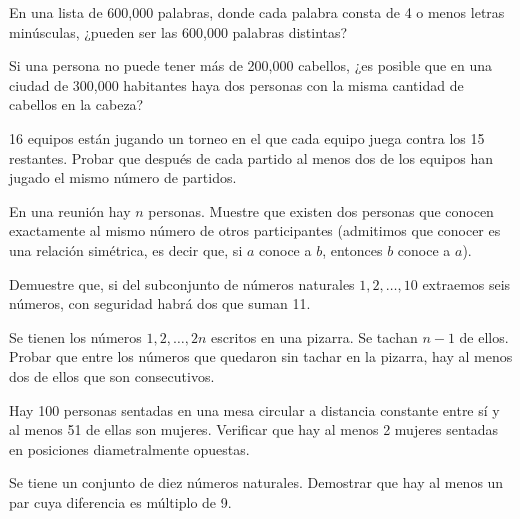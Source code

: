 \begin{problema}
    En una lista de 600,000 palabras, donde cada palabra consta de 4 o menos letras minúsculas, ¿pueden ser las 600,000 palabras distintas?
\end{problema}

\begin{problema}
    Si una persona no puede tener más de 200,000 cabellos, ¿es posible que en una ciudad de 300,000 habitantes haya dos personas con la misma cantidad de cabellos en la cabeza?
\end{problema}

\begin{problema}
    16 equipos están jugando un torneo en el que cada equipo juega contra los 15 restantes. Probar que después de cada partido al menos dos de los equipos han jugado el mismo número de partidos.
\end{problema}

\begin{problema}
    En una reunión hay $n$ personas. Muestre que existen dos personas que conocen exactamente al mismo número de otros participantes (admitimos que conocer es una relación simétrica, es decir que, si $a$ conoce a $b$, entonces $b$ conoce a $a$).
\end{problema}

\begin{problema}
    Demuestre que, si del subconjunto de números naturales $1,2, \dots ,10$ extraemos seis números, con seguridad habrá dos que suman 11.
\end{problema}

\begin{problema}
    Se tienen los números $1, 2, \dots, 2n$ escritos en una pizarra. Se tachan $n-1$ de ellos. Probar que entre los números que quedaron sin tachar en la pizarra, hay al menos dos de ellos que son consecutivos.
\end{problema}

\begin{problema}
    Hay 100 personas sentadas en una mesa circular a distancia constante entre sí y al menos 51 de ellas son mujeres. Verificar que hay al menos 2 mujeres sentadas en posiciones diametralmente opuestas.
\end{problema}

\begin{problema}
    Se tiene un conjunto de diez números naturales. Demostrar que hay al menos un par cuya diferencia es múltiplo de 9.
\end{problema}